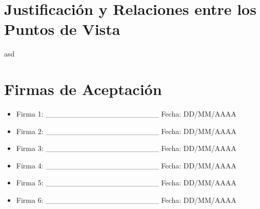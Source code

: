 \documentclass[12pt]{article}
\begin{document}
\section{Justificación y Relaciones entre los Puntos de Vista}
asd

\section{Firmas de Aceptación}
\begin{itemize}
    \item Firma 1: \_\_\_\_\_\_\_\_\_\_\_\_\_\_\_\_\_\_\_\_\_ Fecha: DD/MM/AAAA
    \item Firma 2: \_\_\_\_\_\_\_\_\_\_\_\_\_\_\_\_\_\_\_\_\_ Fecha: DD/MM/AAAA
    \item Firma 3: \_\_\_\_\_\_\_\_\_\_\_\_\_\_\_\_\_\_\_\_\_ Fecha: DD/MM/AAAA
    \item Firma 4: \_\_\_\_\_\_\_\_\_\_\_\_\_\_\_\_\_\_\_\_\_ Fecha: DD/MM/AAAA
    \item Firma 5: \_\_\_\_\_\_\_\_\_\_\_\_\_\_\_\_\_\_\_\_\_ Fecha: DD/MM/AAAA
    \item Firma 6: \_\_\_\_\_\_\_\_\_\_\_\_\_\_\_\_\_\_\_\_\_ Fecha: DD/MM/AAAA
\end{itemize}



\end{document}
